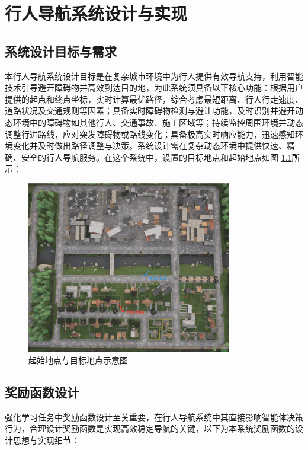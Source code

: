\chapter{行人导航系统设计与实现}

\section{系统设计目标与需求}

本行人导航系统设计目标是在复杂城市环境中为行人提供有效导航支持，利用智能技术引导避开障碍物并高效到达目的地，为此系统须具备以下核心功能：根据用户提供的起点和终点坐标，实时计算最优路径，综合考虑最短距离、行人行走速度、道路状况及交通规则等因素；具备实时障碍物检测与避让功能，及时识别并避开动态环境中的障碍物如其他行人、交通事故、施工区域等；持续监控周围环境并动态调整行进路线，应对突发障碍物或路线变化；具备极高实时响应能力，迅速感知环境变化并及时做出路径调整与决策。系统设计需在复杂动态环境中提供快速、精确、安全的行人导航服务。在这个系统中，设置的目标地点和起始地点如图 \ref{fig:location}所示：

\begin{figure}[H]
    \centering
    \includegraphics[width=0.8\textwidth]{images/location_select.pdf}
    \caption{起始地点与目标地点示意图}
    \label{fig:location}
\end{figure}

\section{奖励函数设计}

强化学习任务中奖励函数设计至关重要，在行人导航系统中其直接影响智能体决策行为，合理设计奖励函数是实现高效稳定导航的关键，以下为本系统奖励函数的设计思想与实现细节：

